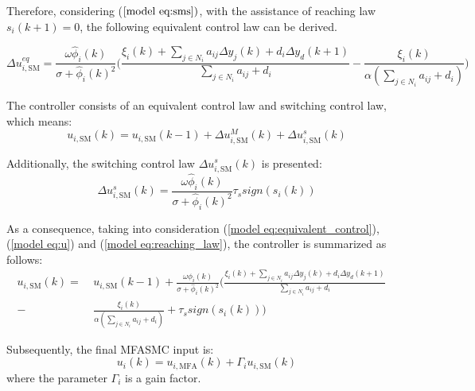 \documentclass[journal,onecolumn]{IEEEtran}
\begin{document}
Therefore, considering ($ \ref{model eq:sms}) $, with the assistance of reaching law $ s_i(k+1) = 0 $, the following equivalent control law can be derived.

\begin{equation}
    \label{model eq:equivalent_control}
    \Delta u_{i,\text{SM}}^{eq} = \frac{\omega \hat{\phi}_i(k)}{\sigma + \hat{\phi}_i(k)^2}\bigg(\frac{\xi_i(k)+ \sum_{j \in N_i}a_{ij} \Delta y_j(k) + d_i \Delta y_d(k+1)}{\displaystyle \sum_{j \in N_i}a_{ij}+d_i} - \frac{\xi_i(k)}{\alpha(\displaystyle \sum_{j \in N_i}a_{ij}+d_i)} 
    \bigg)
\end{equation}

The controller consists of an equivalent control law and switching control law, which means:
\begin{equation}
    \label{model eq:u}
    u_{i,\text{SM}}(k) = u_{i,\text{SM}}(k-1) + \Delta u_{i,\text{SM}}^M(k)+ \Delta u_{i,\text{SM}}^s(k)
\end{equation}

Additionally, the switching control law $ \Delta u_{i,\text{SM}}^s(k) $ is presented:
\begin{equation}
    \label{model eq:reaching_law}
    \Delta u_{i,\text{SM}}^s(k) = \frac{\omega \hat{\phi}_i(k)}{\sigma + \hat{\phi}_i(k)^2}\tau_s sign(s_i(k))
\end{equation}

As a consequence, taking into consideration (\ref{model eq:equivalent_control}), (\ref{model eq:u}) and (\ref{model eq:reaching_law}), the controller is summarized as follows:
\begin{align}
    \label{model eq:sm_controller}
    u_{i,\text{SM}}(k) =\ & u_{i,\text{SM}}(k-1) +  \frac{\omega \hat{\phi}_i(k)}{\sigma + \hat{\phi}_i(k)^2} \bigg( \frac{\xi_i(k)+ \sum_{j \in N_i}a_{ij} \Delta y_j(k) + d_i \Delta y_d(k+1)}{\sum_{j \in N_i}a_{ij}+d_i} \quad \nonumber  \\
    - \ & \frac{\xi_i(k)}{\alpha(\displaystyle \sum_{j \in N_i}a_{ij}+d_i)} + \tau_s sign(s_i(k)) \bigg)
\end{align}
    
Subsequently, the final MFASMC input is:
\begin{equation}
    \label{model eq:mfasmc}
    u_i(k) = u_{i,\text{MFA}}(k) + \Gamma_i  u_{i,\text{SM}}(k)
\end{equation}
where the parameter \(\Gamma_i\) is a gain factor.

\end{document}

